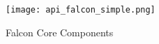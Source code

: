 \begin{figure}[!htb]
\begin{center}
\texttt{[image: api\_falcon\_simple.png]}
\end{center}
\caption{Falcon Core Components}
\label{fig:api-falcon-simple}
\end{figure}




